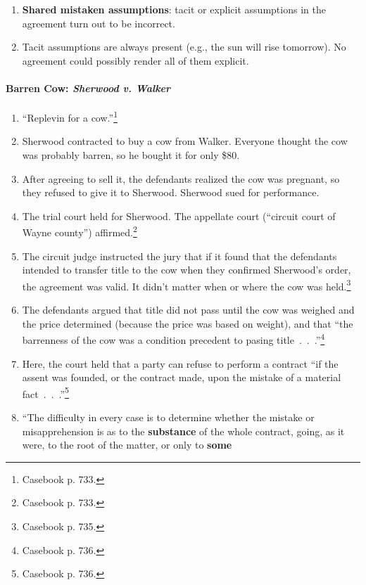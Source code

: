 \begin{enumerate}
    \item \textbf{Shared mistaken assumptions}: tacit or explicit assumptions 
    in the agreement turn out to be incorrect.
    \item Tacit assumptions are always present (e.g., the sun will rise 
    tomorrow). No agreement could possibly render all of them explicit.
\end{enumerate}

\paragraph{Barren Cow: \emph{Sherwood v. Walker}}

\begin{enumerate}
    \item ``Replevin for a cow.''\footnote{Casebook p. 733.}
    \item Sherwood contracted to buy a cow from Walker. Everyone thought the 
    cow was probably barren, so he bought it for only \$80.
    \item After agreeing to sell it, the defendants realized the cow was 
    pregnant, so they refused to give it to Sherwood. Sherwood sued for 
    performance.
    \item The trial court held for Sherwood. The appellate court (``circuit 
    court of Wayne county'') affirmed.\footnote{Casebook p. 733.}
    \item The circuit judge instructed the jury that if it found that the 
    defendants intended to transfer title to the cow when they confirmed 
    Sherwood's order, the agreement was valid. It didn't matter when or where 
    the cow was held.\footnote{Casebook p. 735.}
    \item The defendants argued that title did not pass until the cow was 
    weighed and the price determined (because the price was based on weight), 
    and that ``the barrenness of the cow was a condition precedent to pasing 
    title~.~.~.''\footnote{Casebook p. 736.}
    \item Here, the court held that a party can refuse to perform a contract 
    ``if the assent was founded, or the contract made, upon the mistake of a 
    material fact~.~.~.''\footnote{Casebook p. 736.}
    \item ``The difficulty in every case is to determine whether the mistake 
    or misapprehension is as to the \textbf{substance} of the whole contract, 
    going, as it were, to the root of the matter, or only to \textbf{some 
}
\end{enumerate}

